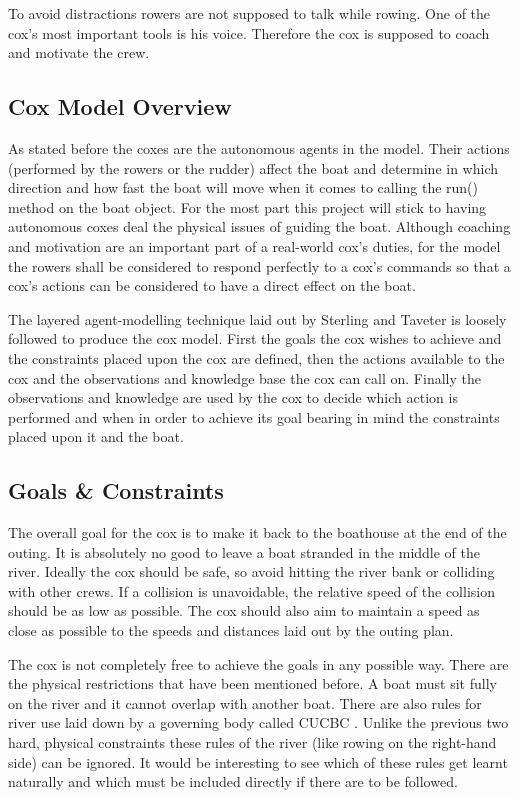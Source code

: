       To avoid distractions rowers are not supposed to talk while rowing. One of the cox's most important tools is his voice. Therefore the cox is supposed to coach and motivate the crew.
      
      \subsection{Cox Model Overview}
      As stated before the coxes are the autonomous agents in the model. Their actions (performed by the rowers or the rudder) affect the boat and determine in which direction and how fast the boat will move when it comes to calling the run() method on the boat object. For the most part this project will stick to having autonomous coxes deal the physical issues of guiding the boat. Although coaching and motivation are an important part of a real-world cox's duties, for the model the rowers shall be considered to respond perfectly to a cox's commands so that a cox's actions can be considered to have a direct effect on the boat.
      
      The layered agent-modelling technique laid out by Sterling and Taveter \cite{Sterling2009} is loosely followed to produce the cox model. First the goals the cox wishes to achieve and the constraints placed upon the cox are defined, then the actions available to the cox and the observations and knowledge base the cox can call on. Finally the observations and knowledge are used by the cox to decide which action is performed and when in order to achieve its goal bearing in mind the constraints placed upon it and the boat.

      \subsection{Goals \& Constraints}
      The overall goal for the cox is to make it back to the boathouse at the end of the outing. It is absolutely no good to leave a boat stranded in the middle of the river. Ideally the cox should be safe, so avoid hitting the river bank or colliding with other crews. If a collision is unavoidable, the relative speed of the collision should be as low as possible. The cox should also aim to maintain a speed as close as possible to the speeds and distances laid out by the outing plan.
      
      The cox is not completely free to achieve the goals in any possible way. There are the physical restrictions that have been mentioned before. A boat must sit fully on the river and it cannot overlap with another boat. There are also rules for river use laid down by a governing body called CUCBC \cite{CUCBC}. Unlike the previous two hard, physical constraints these rules of the river (like rowing on the right-hand side) can be ignored. It would be interesting to see which of these rules get learnt naturally and which must be included directly if there are to be followed.
      
